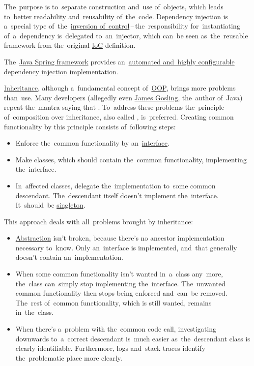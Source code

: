 The~purpose is to~separate construction and~use of~objects, which leads to~better readability and~reusability of~the~code.
Dependency injection is a~special type of~the~\hyperref[inversionofcontrol]{inversion of~control}\,--\,the~responsibility for~instantiating of~a~dependency is~delegated to~an~injector, which can~be seen as~the~reusable framework from the~original \hyperref[inversionofcontrol]{IoC} definition.

The~\hyperref[springframework]{Java Spring framework} provides an~\hyperref[springdependencyinjection]{automated and~highly configurable dependency injection} implementation.

\label{compositionoverinheritance}
\hyperref[inheritance]{Inheritance}, although a~fundamental concept of~\hyperref[objectorientedprogramming]{OOP}, brings more problems than~use.
Many developers (allegedly even \href{https://en.wikipedia.org/wiki/James_Gosling}{James Gosling}, the~author of~Java) repeat the~mantra saying that .
To~address these problems the~principle of~composition over inheritance, also called , is~preferred.
Creating common functionality by this principle consists of~following steps:
\begin{itemize}
    \item Enforce the~common functionality by an~\hyperref[javainterface]{interface}.
    \item Make classes, which should contain the~common functionality, implementing the~interface.
    \item In~affected classes, delegate the~implementation to~some common descendant.
          The~descendant itself doesn't implement the~interface.
          It~should~be \hyperref[singletondp]{singleton}.
\end{itemize}

\noindent This approach deals with all~problems brought by inheritance:
\begin{itemize}
    \item \hyperref[abstraction]{Abstraction} isn't broken, because there's no ancestor implementation necessary to~know.
          Only an~interface is implemented, and~that generally doesn't contain an~implementation.
    \item When some common functionality isn't wanted in~a~class any~more, the~class can~simply stop implementing the~interface.
          The~unwanted common functionality then stops being enforced and~can~be removed.
          The~rest of~common functionality, which is still wanted, remains in~the~class.
    \item When there's a~problem with the~common code call, investigating downwards to~a~correct descendant is~much easier as~the~descendant class is clearly identifiable.
          Furthermore, logs and~stack traces identify the~problematic place more clearly.
\end{itemize}

